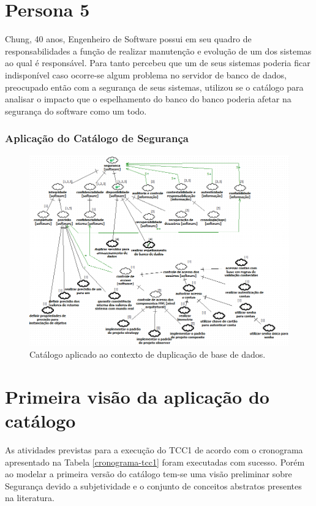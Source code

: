 \section{Persona 5}
\label{subsec:persona5}

Chung, 40 anos, Engenheiro de Software possui em seu quadro de responsabilidades a função de realizar manutenção e evolução de um dos sistemas ao qual é responsável. Para tanto percebeu que um de seus sistemas poderia ficar indisponível caso ocorre-se algum problema no servidor de banco de dados, preocupado então com a segurança de seus sistemas, utilizou se o catálogo para analisar o impacto que o espelhamento do banco do banco poderia afetar na segurança do software como um todo. 

\subsubsection{Aplicação do Catálogo de Segurança}

\begin{figure}[h!]
	\centering
	\includegraphics[keepaspectratio=true,scale=0.7]{figuras/catalogoPersona5.PNG}
	\caption{Catálogo aplicado ao contexto de duplicação de base de dados.}
	\label{catalogoPersona5}
\end{figure}



\section{Primeira visão da aplicação do catálogo}
\label{sec: aplicacaoDoCatalogo}
As atividades previstas para a execução do TCC1 de acordo com o cronograma apresentado na Tabela \ref{cronograma-tcc1} foram executadas com sucesso. Porém ao modelar a primeira versão do catálogo tem-se uma visão preliminar sobre Segurança devido a subjetividade e o conjunto de conceitos abstratos presentes na literatura.

